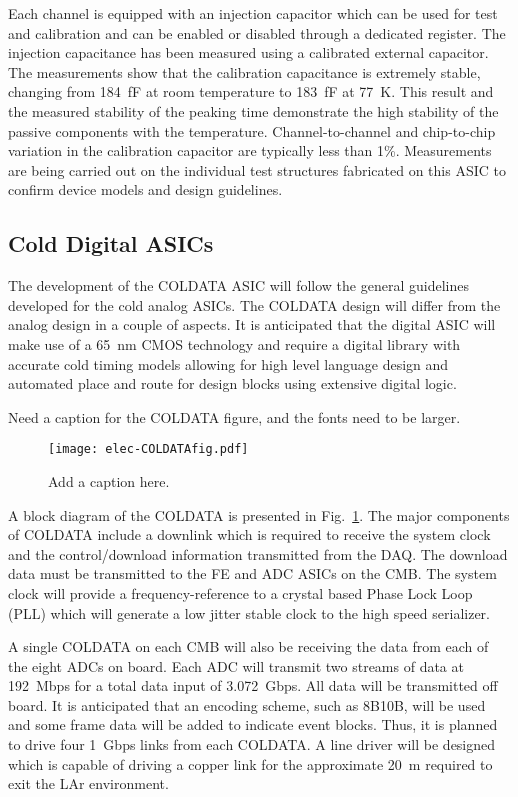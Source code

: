 Each channel is equipped with an injection capacitor which can be used
for test and calibration and can be enabled or disabled through a
dedicated register. The injection capacitance has been measured using 
a calibrated external capacitor. The measurements show
that the calibration capacitance is extremely stable, changing from
184~fF at room temperature to 183~fF at 77~K. This result and the measured
stability of the peaking time demonstrate the high stability of the
passive components with the temperature. Channel-to-channel and chip-to-chip
variation in the calibration capacitor are typically less than 1\%. Measurements are being carried
out on the individual test structures fabricated on this ASIC to
confirm device models and design guidelines.

%
\subsection{Cold Digital ASICs}
\label{subsec:fe-CMOS-digital}

The development of the COLDATA ASIC will follow the general guidelines developed for the cold analog ASICs.
The COLDATA design will differ from the analog design in a couple of aspects.
It is anticipated that the digital ASIC will make use of a 65~nm CMOS technology and require a
digital library with accurate cold timing models allowing for high level language design and
automated place and route for design blocks using extensive digital logic.  

\begin{editornote}
  Need a caption for the COLDATA figure, and the fonts need to be larger.
\end{editornote}
\begin{figure}[htbp]
\centering
\texttt{[image: elec-COLDATAfig.pdf]}
\caption{Add a caption here.}
\label{fig:elec-COLDATAfig}
\end{figure}
A block diagram of the COLDATA is presented in Fig.~\ref{fig:elec-COLDATAfig}.
The major components of COLDATA include a downlink which is required to receive the system clock and
the control/download information transmitted from the DAQ.
The download data must be transmitted to the FE and ADC ASICs on the CMB.
The system clock will provide a frequency-reference to a crystal based Phase Lock Loop (PLL)
which will generate a low jitter stable clock to the high speed serializer. 

A single COLDATA on each CMB will also be receiving the data from each of the eight ADCs on board.
Each ADC will transmit two streams of data at 192~Mbps for a total data input of 3.072~Gbps.
All data will be transmitted off board.
It is anticipated that an encoding scheme, such as 8B10B, will be used and
some frame data will be added to indicate event blocks.
Thus, it is planned to drive four 1~Gbps links from each COLDATA.
A line driver will be designed which is capable of driving a copper link for the approximate 20~m required
to exit the LAr environment. 

